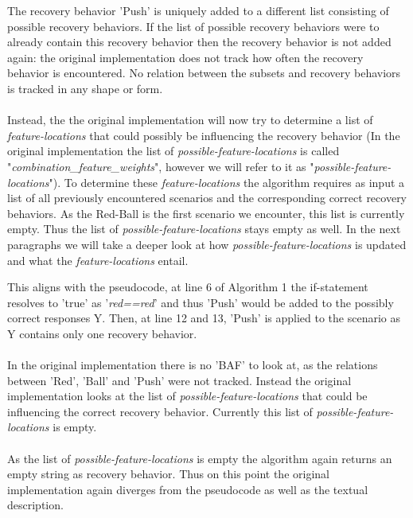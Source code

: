 \documentclass{article}
\begin{document}
The recovery behavior 'Push' is uniquely added to a different list consisting of possible recovery behaviors. If the list of possible recovery behaviors were to already contain this recovery behavior then the recovery behavior is not added again: the original implementation does not track how often the recovery behavior is encountered. No relation between the subsets and recovery behaviors is tracked in any shape or form.
\\\\
Instead, the the original implementation will now try to determine a list of \textit{feature-locations} that could possibly be influencing the recovery behavior (In the original implementation the list of \textit{possible-feature-locations} is called "\textit{combination\_feature\_weights}", however we will refer to it as "\textit{possible-feature-locations}"). To determine these \textit{feature-locations} the algorithm requires as input a list of all previously encountered scenarios and the corresponding correct recovery behaviors. As the Red-Ball is the first scenario we encounter, this list is currently empty. Thus the list of \textit{possible-feature-locations} stays empty as well. In the next paragraphs we will take a deeper look at how \textit{possible-feature-locations} is updated and what the \textit{feature-locations} entail.

\begin{quote}
\textit{}
\end{quote}
This aligns with the pseudocode, at line 6 of Algorithm 1 the if-statement resolves to 'true' as '\textit{red==red}' and thus 'Push' would be added to the possibly correct responses Y. Then, at line 12 and 13, 'Push' is applied to the scenario as Y contains only one recovery behavior.
\\\\
In the original implementation there is no 'BAF' to look at, as the relations between 'Red', 'Ball' and 'Push' were not tracked. Instead the original implementation looks at the list of \textit{possible-feature-locations} that could be influencing the correct recovery behavior. Currently this list of \textit{possible-feature-locations} is empty.
\\\\
As the list of \textit{possible-feature-locations} is empty the algorithm again returns an empty string as recovery behavior. Thus on this point the original implementation again diverges from the pseudocode as well as the textual description. 
\end{document}

